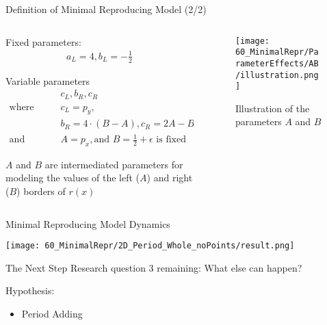 \begin{frame}{Definition of Minimal Reproducing Model (2/2)}
    \vspace{-1em}
    \begin{columns}
        \begin{column}{.7 \textwidth}
            Fixed parameters:
            \begin{align*}
                a_L = 4, b_L = -\frac{1}{2}
            \end{align*}

            Variable parameters
            \begin{align*}
                 & c_L, b_R, c_R                                                    \\
                \text{where} \qquad
                 & c_L = p_y,                                                       \\
                 & b_R = 4 \cdot (B - A), c_R = 2A - B                              \\
                \text {and} \qquad
                 & A = p_x, \text{and } B = \frac{1}{2} + \epsilon \text{ is fixed}
            \end{align*}

            $A$ and $B$ are intermediated parameters for modeling the values of the left ($A$) and right ($B$) borders of $r(x)$
        \end{column}
        \begin{column}{.3 \textwidth}
            \begin{figure}
                \centering
                \texttt{[image: 60\_MinimalRepr/ParameterEffects/AB/illustration.png]}
                \caption*{Illustration of the parameters $A$ and $B$}
            \end{figure}
        \end{column}
    \end{columns}
\end{frame}

\begin{frame}{Minimal Reproducing Model Dynamics}
    \begin{center}
        \texttt{[image: 60\_MinimalRepr/2D\_Period\_Whole\_noPoints/result.png]}
    \end{center}
\end{frame}

\begin{frame}{The Next Step}
    Research question 3 remaining: What else can happen?

    \pause
    \vspace{2em}
    Hypothesis:
    \begin{itemize}
        \item Period Adding
    \end{itemize}
\end{frame}

